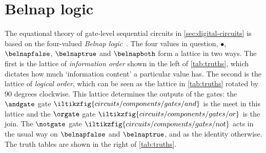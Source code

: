 \section{Belnap logic}
\label{app:belnap}

The equational theory of gate-level sequential circuits in
\cref{sec:digital-circuits} is based on the four-valued
\emph{Belnap logic}~\cite{belnap1977useful}.
The four values in question, \(\bullet\), \(\belnapfalse\), \(\belnaptrue\)
and \(\belnapboth\) form a lattice in two ways.
The first is the lattice of \emph{information order} shown in the left of
\cref{tab:truths}, which dictates how much `information content' a particular value
has.
The second is the lattice of \emph{logical order}, which can be seen as the
lattice in \cref{tab:truths} rotated by 90 degrees clockwise.
This lattice determines the outputs of the gates: the \(\andgate\) gate \(
    \iltikzfig{circuits/components/gates/and}
\) is the meet in this lattice and the \(\orgate\) gate \(
    \iltikzfig{circuits/components/gates/or}
\) is the join.
The \(\notgate\) gate \(
    \iltikzfig{circuits/components/gates/not}
\) acts in the usual way on \(\belnapfalse\) and \(\belnaptrue\), and as the
identity otherwise.
The truth tables are shown in the right of \cref{tab:truths}.


